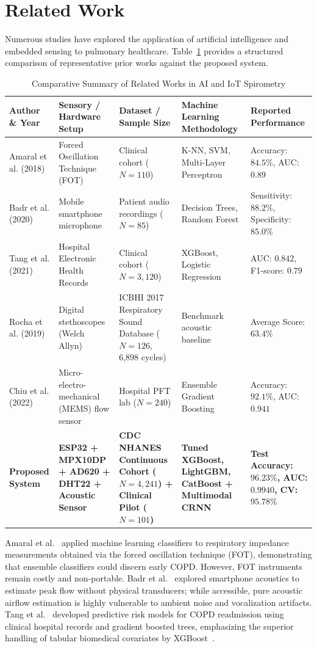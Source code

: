 \documentclass[conference]{IEEEtran}
\begin{document}
\section{Related Work}
Numerous studies have explored the application of artificial intelligence and embedded sensing to pulmonary healthcare. Table~\ref{tab:literature} provides a structured comparison of representative prior works against the proposed system.

\begin{table}[t]
\caption{Comparative Summary of Related Works in AI and IoT Spirometry}
\label{tab:literature}
\centering
\begin{tabular}{lp{3.5cm}p{3.2cm}p{3.5cm}p{2.8cm}}
\toprule
\textbf{Author \& Year} & \textbf{Sensory / Hardware Setup} & \textbf{Dataset / Sample Size} & \textbf{Machine Learning Methodology} & \textbf{Reported Performance} \\
\midrule
Amaral et al. (2018)~\cite{amaral2018machine} & Forced Oscillation Technique (FOT) & Clinical cohort ($N=110$) & K-NN, SVM, Multi-Layer Perceptron & Accuracy: $84.5\%$, AUC: $0.89$ \\
Badr et al. (2020)~\cite{badr2020smart} & Mobile smartphone microphone & Patient audio recordings ($N=85$) & Decision Trees, Random Forest & Sensitivity: $88.2\%$, Specificity: $85.0\%$ \\
Tang et al. (2021)~\cite{tang2021predicting} & Hospital Electronic Health Records & Clinical cohort ($N=3,120$) & XGBoost, Logistic Regression & AUC: $0.842$, F1-score: $0.79$ \\
Rocha et al. (2019)~\cite{rocha2019icbhi} & Digital stethoscopes (Welch Allyn) & ICBHI 2017 Respiratory Sound Database ($N=126$, 6,898 cycles) & Benchmark acoustic baseline & Average Score: $63.4\%$ \\
Chiu et al. (2022)~\cite{chiu2022multimodal} & Micro-electro-mechanical (MEMS) flow sensor & Hospital PFT lab ($N=240$) & Ensemble Gradient Boosting & Accuracy: $92.1\%$, AUC: $0.941$ \\
\textbf{Proposed System} & \textbf{ESP32 + MPX10DP + AD620 + DHT22 + Acoustic Sensor} & \textbf{CDC NHANES Continuous Cohort ($N=4,241$) + Clinical Pilot ($N=101$)} & \textbf{Tuned XGBoost, LightGBM, CatBoost + Multimodal CRNN} & \textbf{Test Accuracy: $96.23\%$, AUC: $0.9940$, CV: $95.78\%$} \\
\bottomrule
\end{tabular}
\end{table}

Amaral et al.~\cite{amaral2018machine} applied machine learning classifiers to respiratory impedance measurements obtained via the forced oscillation technique (FOT), demonstrating that ensemble classifiers could discern early COPD. However, FOT instruments remain costly and non-portable. Badr et al.~\cite{badr2020smart} explored smartphone acoustics to estimate peak flow without physical transducers; while accessible, pure acoustic airflow estimation is highly vulnerable to ambient noise and vocalization artifacts. Tang et al.~\cite{tang2021predicting} developed predictive risk models for COPD readmission using clinical hospital records and gradient boosted trees, emphasizing the superior handling of tabular biomedical covariates by XGBoost~\cite{chen2016xgboost}.
\end{document}
